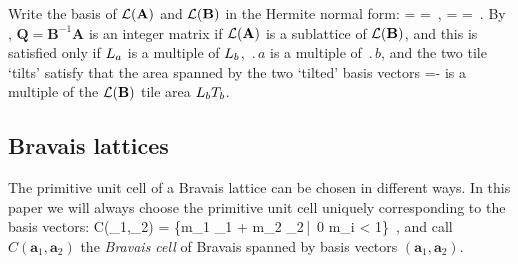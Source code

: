 {Write the basis of $\mathcal{L}(\mathbf{A})$ and $\mathcal{L}(\mathbf{B})$ in the Hermite normal form:
\beq
{} =
=
\,, \quad
{} =
=
\,.
By , $\mathbf{Q} = \mathbf{B}^{-1} \mathbf{A}$ is an integer matrix if
$\mathcal{L}(\mathbf{A})$ is a sublattice of $\mathcal{L}(\mathbf{B})$,
and this is satisfied only if
${L_{a}}$ is a multiple of ${L_{b}}$,
$\period{a}$ is a multiple of $\period{b}$, and the two tile `tilts'
satisfy that the area spanned by the two `tilted' basis vectors
\beq
\det
{}
=-
is a multiple of the $\mathcal{L}(\mathbf{B})$ tile area ${L_{b}}{T_{b}}$.


\subsection{Bravais lattices}
\label{s:BravaisLatt}

The primitive unit cell of a Bravais lattice can be
chosen in different ways. In this paper we will always choose the primitive unit cell uniquely corresponding
to the basis vectors:
\beq
C(_{1},_{2}) = \{m_1 _1 + m_2 _2\,|\, 0 \leq m_i < 1\}
\,,
and call $C(\mathbf{a}_{1},\mathbf{a}_{2})$ the \emph{Bravais cell} of Bravais spanned by basis vectors
$(\mathbf{a}_{1},\mathbf{a}_{2})$.
	}


